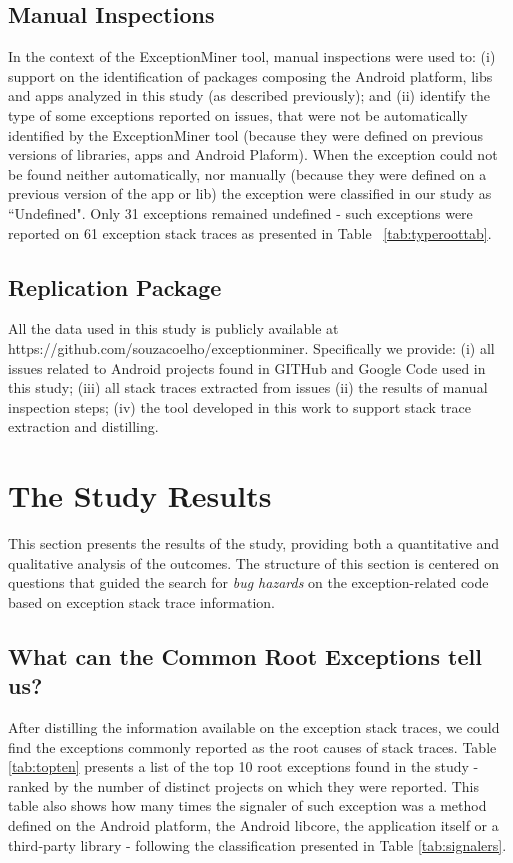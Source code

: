 \documentclass[conference]{IEEEtran}
\begin{document}
\subsection{Manual Inspections}
\label{sec:manual}
In the context of the ExceptionMiner tool, manual inspections were used to:
(i) support on the identification of packages composing the Android platform, 
libs and apps analyzed in this study (as described previously); and (ii)  
identify the type of some exceptions reported on issues, 
that were not be automatically identified by the ExceptionMiner tool
(because they were defined on previous versions of libraries,
apps and Android Plaform). When the exception could not be  
found neither automatically, nor manually (because they were defined on a previous version
of the app or lib) the exception were classified 
in our study as ``Undefined".  Only 31 exceptions 
remained undefined - such exceptions were reported on 61 exception stack traces as 
presented in Table ~\ref{tab:typeroottab}.

\subsection{Replication Package}
All the data used in this study is publicly available at https://github.com/souzacoelho/exceptionminer.
Specifically we provide: (i) all issues related to Android projects found
in GITHub and Google Code used in this study; (iii) all stack traces extracted
from issues (ii) the results of manual inspection steps; (iv) the tool developed 
in this work to support stack trace extraction and distilling.

\section{The Study Results}
\label{sec:result}

This section presents the results of the study, providing both a
quantitative and qualitative analysis of the outcomes. The structure of this section
 is centered on questions that guided the search for \emph{bug hazards} on the exception-related code
based on exception stack trace information.

\subsection{What can the Common Root Exceptions tell us? }

After distilling the information available on the exception stack traces, we could find 
the exceptions commonly reported as the root causes of stack traces.
Table \ref{tab:topten} presents a list of the top 10 root exceptions found in the study - 
 ranked by the number of distinct projects on which they were reported. 
This table also shows how many times the signaler of such exception was a method defined on
the Android platform, the Android libcore, the application itself or a third-party library -
 following the classification presented in Table  \ref{tab:signalers}. 
\end{document}
